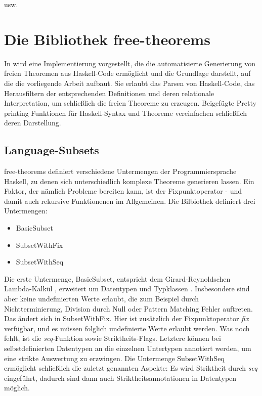 \documentclass[11pt]{article} %
\begin{document}
usw.

\section{Die Bibliothek free-theorems}

In \cite{freetheorems} wird eine Implementierung vorgestellt, die die automatisierte Generierung von freien Theoremen aus
Haskell-Code ermöglicht und die Grundlage darstellt, auf die die vorliegende Arbeit aufbaut.
Sie erlaubt das Parsen von Haskell-Code, das Herausfiltern der entsprechenden Definitionen und deren relationale
Interpretation, um schließlich die freien Theoreme zu erzeugen.
Beigefügte Pretty printing Funktionen für Haskell-Syntax und Theoreme vereinfachen schließlich deren Darstellung.

\subsection{Language-Subsets}

free-theorems definiert verschiedene Untermengen der Programmiersprache Haskell, zu denen sich unterschiedlich komplexe
Theoreme generieren lassen. Ein Faktor, der nämlich Probleme bereiten kann, ist der Fixpunktoperator - und damit auch rekursive
Funktionenen im Allgemeinen.
Die Bilbiothek definiert drei Untermengen:

\begin{itemize}
   \item BasicSubset
   \item SubsetWithFix
   \item SubsetWithSeq
\end{itemize}

Die erste Untermenge, BasicSubset, entspricht dem Girard-Reynoldschen Lambda-Kalkül \cite{bla}, erweitert um Datentypen und
Typklassen \cite{freetheorems}. Insbesondere sind aber keine undefinierten Werte erlaubt, die zum Beispiel durch Nichtterminierung,
Division durch Null oder Pattern Matching Fehler auftreten.
Das ändert sich in SubsetWithFix. Hier ist zusätzlich der Fixpunktoperator \textit{fix} verfügbar, und es müssen folglich undefinierte
Werte erlaubt werden. Was noch fehlt, ist die \textit{seq}-Funktion sowie Striktheits-Flags. Letztere können bei selbstdefinierten
Datentypen an die einzelnen Untertypen  annotiert werden,
um eine strikte Auswertung zu erzwingen.
Die Untermenge SubsetWithSeq ermöglicht schließlich die zuletzt genannten Aspekte: Es wird Striktheit durch \textit{seq}
eingeführt, dadurch sind dann auch Striktheitsannotationen in Datentypen möglich.
\end{document}
